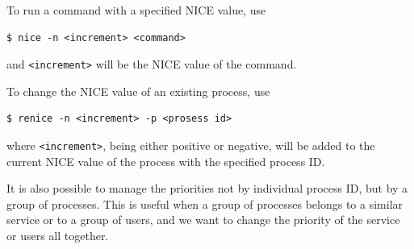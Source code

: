 To run a command with a specified NICE value, use
\begin{lstlisting}
$ nice -n <increment> <command>
\end{lstlisting}
and \verb|<increment>| will be the NICE value of the command.

To change the NICE value of an existing process, use
\begin{lstlisting}
$ renice -n <increment> -p <prosess id>
\end{lstlisting}
where \verb|<increment>|, being either positive or negative, will be added to the current NICE value of the process with the specified process ID.

It is also possible to manage the priorities not by individual process ID, but by a group of processes. This is useful when a group of processes belongs to a similar service or to a group of users, and we want to change the priority of the service or users all together.


